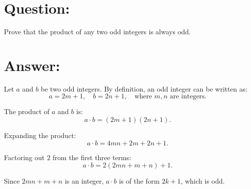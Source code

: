 \documentclass{article}
\begin{document}
\section{Question:}

Prove that the product of any two odd integers is always odd.

\section{Answer:}

Let $a$ and $b$ be two odd integers. By definition, an odd integer can be written as:
\begin{equation}
    a = 2m + 1, \quad b = 2n + 1, \quad \text{where } m, n \text{ are integers}.
\end{equation}

The product of $a$ and $b$ is:
\begin{equation}
    a \cdot b = (2m + 1)(2n + 1).
\end{equation}

Expanding the product:
\begin{equation}
    a \cdot b = 4mn + 2m + 2n + 1.
\end{equation}

Factoring out $2$ from the first three terms:
\begin{equation}
    a \cdot b = 2(2mn + m + n) + 1.
\end{equation}

Since $2mn + m + n$ is an integer, $a \cdot b$ is of the form $2k + 1$, which is odd.
\end{document}
